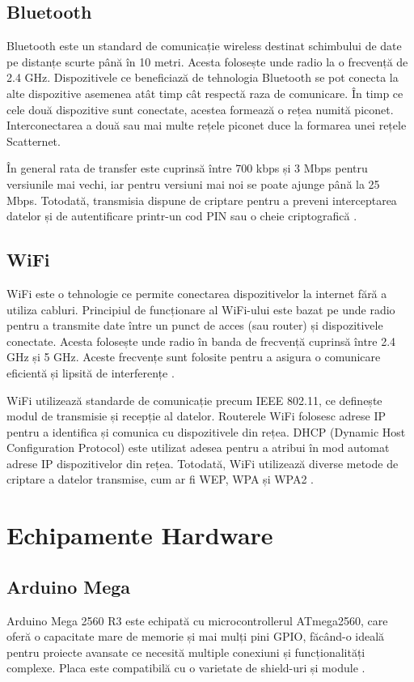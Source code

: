 \subsection{Bluetooth}
Bluetooth este un standard de comunicație wireless destinat schimbului de date pe distanțe scurte până în 10 metri. Acesta folosește unde radio la o frecvență de 2.4 GHz. Dispozitivele ce beneficiază de tehnologia Bluetooth se pot conecta la alte dispozitive asemenea atât timp cât respectă raza de comunicare. În timp ce cele două dispozitive sunt conectate, acestea formează o rețea numită piconet. Interconectarea a două sau mai multe rețele piconet duce la formarea unei rețele Scatternet.

În general rata de transfer este cuprinsă între 700 kbps și 3 Mbps pentru versiunile mai vechi, iar pentru versiuni mai noi se poate ajunge până la 25 Mbps. Totodată, transmisia dispune de criptare pentru a preveni interceptarea datelor și de autentificare printr-un cod PIN sau o cheie criptografică \cite{bisdikian2001overview}.

\subsection{WiFi}
WiFi este o tehnologie ce permite conectarea dispozitivelor la internet fără a utiliza cabluri. Principiul de funcționare al WiFi-ului este bazat pe unde radio pentru a transmite date între un punct de acces (sau router) și dispozitivele conectate. Acesta folosește unde radio în banda de frecvență cuprinsă între 2.4 GHz și 5 GHz. Aceste frecvențe sunt folosite pentru a asigura o comunicare eficientă și lipsită de interferențe \cite{chernukhin2014new}.

WiFi utilizează standarde de comunicație precum IEEE 802.11, ce definește modul de transmisie și recepție al datelor. Routerele WiFi folosesc adrese IP pentru a identifica și comunica cu dispozitivele din rețea. DHCP (Dynamic Host Configuration Protocol) este utilizat adesea pentru a atribui în mod automat adrese IP dispozitivelor din rețea. Totodată, WiFi utilizează diverse metode de criptare a datelor transmise, cum ar fi WEP, WPA și WPA2 \cite{hiertz2010ieee}.

\section{Echipamente Hardware}

\subsection{Arduino Mega}
Arduino Mega 2560 R3 este echipată cu microcontrollerul ATmega2560, care oferă o capacitate mare de memorie și mai mulți pini GPIO, făcând-o ideală pentru proiecte avansate ce necesită multiple conexiuni și funcționalități complexe. Placa este compatibilă cu o varietate de shield-uri și module \cite{mega_datasheet}.

